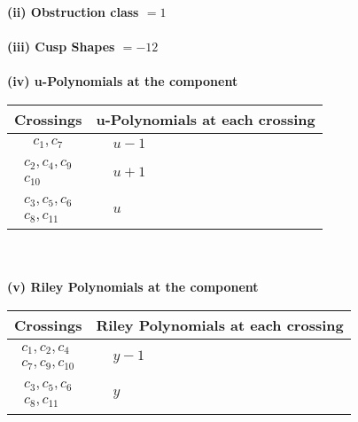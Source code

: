 \documentclass[1p]{elsarticle_modified}
\theoremstyle{definition}
\begin{document}
\flushleft \textbf{(ii) Obstruction class $= 1$}\\~\\
\flushleft \textbf{(iii) Cusp Shapes $= -12$}\\~\\
\newpage\renewcommand{\arraystretch}{1}
\flushleft \textbf{(iv) u-Polynomials at the component}\newline \\
\begin{tabular}{m{50pt}|m{274pt}}
Crossings & \hspace{64pt}u-Polynomials at each crossing \\
\hline $$\begin{aligned}c_{1},c_{7}\end{aligned}$$&$\begin{aligned}
&u-1
\end{aligned}$\\
\hline $$\begin{aligned}c_{2},c_{4},c_{9}\\c_{10}\end{aligned}$$&$\begin{aligned}
&u+1
\end{aligned}$\\
\hline $$\begin{aligned}c_{3},c_{5},c_{6}\\c_{8},c_{11}\end{aligned}$$&$\begin{aligned}
&u
\end{aligned}$\\
\hline
\end{tabular}\\~\\
\newpage\renewcommand{\arraystretch}{1}
\flushleft \textbf{(v) Riley Polynomials at the component}\newline \\
\begin{tabular}{m{50pt}|m{274pt}}
Crossings & \hspace{64pt}Riley Polynomials at each crossing \\
\hline $$\begin{aligned}c_{1},c_{2},c_{4}\\c_{7},c_{9},c_{10}\end{aligned}$$&$\begin{aligned}
&y-1
\end{aligned}$\\
\hline $$\begin{aligned}c_{3},c_{5},c_{6}\\c_{8},c_{11}\end{aligned}$$&$\begin{aligned}
&y
\end{aligned}$\\
\hline
\end{tabular}\\~\\
\end{document}
